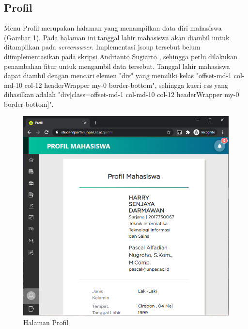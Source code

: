 \subsection{Profil}
    Menu Profil merupakan halaman yang menampilkan data diri mahasiswa (Gambar \ref{fig:3_profil}). Pada halaman ini tanggal lahir mahasiswa akan diambil untuk ditampilkan pada \textit{screensaver}. Implementasi jsoup tersebut belum diimplementasikan pada skripsi Andrianto Sugiarto \cite{ifstupor}, sehingga perlu dilakukan penambahan fitur untuk mengambil data tersebut. Tanggal lahir mahasiswa dapat diambil dengan mencari elemen "div" yang memiliki kelas "offset-md-1 col-md-10 col-12 headerWrapper my-0 border-bottom", sehingga kueri css yang dihasilkan adalah "div[class=offset-md-1 col-md-10 col-12 headerWrapper my-0 border-bottom]".
    \begin{figure}[H]
    	\centering
    	\includegraphics[scale=0.45]{Gambar/profil.png}
    	\caption{Halaman Profil} 
    	\label{fig:3_profil}
    \end{figure}

